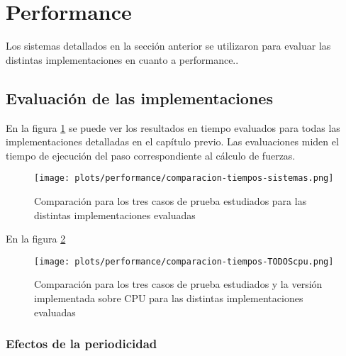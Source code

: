 \section{Performance}
Los sistemas detallados en la sección anterior se utilizaron para evaluar las distintas implementaciones en cuanto a performance..

\subsection{Evaluación de las implementaciones}


En la figura \ref{time-compare} se puede ver los resultados en tiempo evaluados para todas las implementaciones detalladas en el capítulo previo.
Las evaluaciones miden el tiempo de ejecución del paso correspondiente al cálculo de fuerzas.



\begin{figure}[htbp]
\centering
   \texttt{[image: plots/performance/comparacion-tiempos-sistemas.png]}
 \caption{Comparaci\'on para los tres casos de prueba estudiados para las distintas implementaciones evaluadas}
 \label{time-compare}
\end{figure}


En la figura \ref{time-compare-cpu}


\begin{figure}[htbp]
\centering
   \texttt{[image: plots/performance/comparacion-tiempos-TODOScpu.png]}
 \caption{Comparaci\'on para los tres casos de prueba estudiados y la versión implementada sobre CPU para las distintas implementaciones evaluadas}
 \label{time-compare-cpu}
\end{figure}

\subsubsection{Efectos de la periodicidad}



